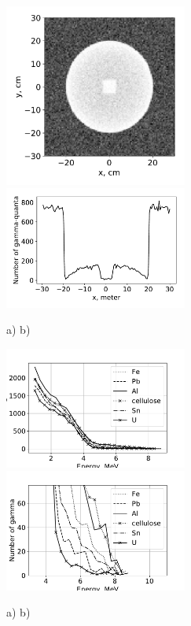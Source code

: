 \documentclass[a4paper]{panl}
\begin{document}
\begin{figure}[t]
    \begin{center}
        \includegraphics[width=60mm]{figures/UranCube1.pdf} 
        \includegraphics[width=60mm]{figures/UranCube2.pdf}  
        \vspace{-3mm}
        \caption{a) b)}
    \end{center}
    \vspace{-5mm}
\end{figure}

\begin{figure}[t]
    \begin{center}
        \includegraphics[width=60mm]{figures/diffmat0.pdf} 
        \includegraphics[width=60mm]{figures/diffmat.pdf}  
        \vspace{-3mm}
        \caption{a) b)}
    \end{center}
    \vspace{-5mm}
\end{figure}
\end{document}

